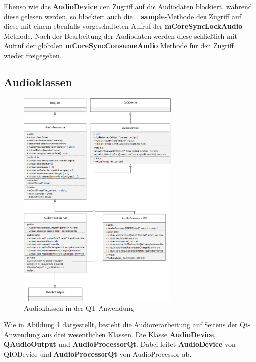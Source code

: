 \documentclass[11pt,a4paper]{scrartcl}
\begin{document}
Ebenso wie das \textbf{AudioDevice} den Zugriff auf die Audiodaten blockiert, w\"ahrend diese gelesen werden, so blockiert auch die \textbf{{\_}sample}-Methode den Zugriff auf diese mit einem ebenfalls vorgeschalteten Aufruf der \textbf{mCoreSyncLockAudio} Methode. Nach der Bearbeitung der Audiodaten werden diese schlie{\ss}lich mit Aufruf der globalen \textbf{mCoreSyncConsumeAudio} Methode f\"ur den Zugriff wieder freigegeben.

\newpage

\subsection{Audioklassen}

\begin{figure}[h]
    \centering
    \includegraphics[width=0.7\textwidth]{QT_Klassendiagramm}
    \caption{Audioklassen in der QT-Anwendung}
    \label{fig:qtclassdiagramm}
\end{figure}

Wie in Abildung \ref{fig:qtclassdiagramm} dargestellt, besteht die Audioverarbeitung auf Seitens der Qt-Anwendung aus drei wesentlichen Klassen. Die Klasse \textbf{AudioDevice}, \textbf{QAudioOutput} und \textbf{AudioProcessorQt}.
Dabei leitet \textbf{AudioDevice} von QIODevice und \textbf{AudioProcessorQt} von AudioProcessor ab.
\end{document}

